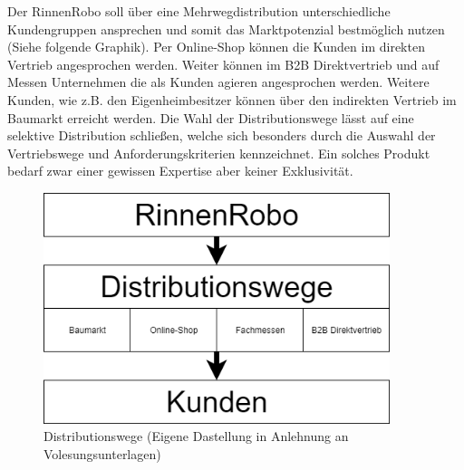        \noindent
        Der RinnenRobo soll über eine Mehrwegdistribution unterschiedliche Kundengruppen ansprechen und somit das
        Marktpotenzial bestmöglich nutzen (Siehe folgende Graphik). Per Online-Shop können die Kunden im direkten Vertrieb
        angesprochen werden. Weiter können im B2B Direktvertrieb und auf Messen Unternehmen die als Kunden agieren
        angesprochen werden. Weitere Kunden, wie z.B. den Eigenheimbesitzer können über den indirekten Vertrieb im Baumarkt
        erreicht werden. Die Wahl der Distributionswege lässt auf eine selektive Distribution schließen, welche sich
        besonders durch die Auswahl der Vertriebswege und Anforderungskriterien kennzeichnet. Ein solches Produkt bedarf
        zwar einer gewissen Expertise aber keiner Exklusivität.
    
         \begin{figure}[ht]
            \centering
            \includegraphics[width = 0.9\textwidth]{Eigene Darstellungen/Distributionswege1.png}
    
            \caption{Distributionswege (Eigene Dastellung in Anlehnung an Volesungsunterlagen)}
         \end{figure}